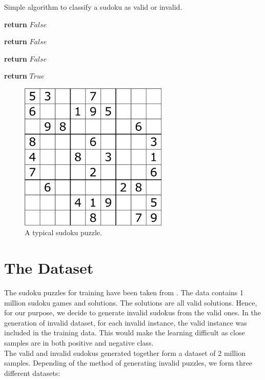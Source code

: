 \documentclass[twoside]{article}
\begin{document}
\begin{algorithm}
  \caption{Simple algorithm to classify a sudoku as valid or invalid.}\label{algo:algo1}
  \begin{algorithmic}[1]
           
    			\State \textbf{return} $False$
    		\EndIf
      	\EndFor
      \EndFor

        
    			\State \textbf{return} $False$
    		\EndIf
      	\EndFor
      \EndFor

        
    			\State \textbf{return} $False$
    		\EndIf
      	\EndFor
      \EndFor

      \State \textbf{return} $True$    
      \EndProcedure
  \end{algorithmic}
\end{algorithm}

\begin{figure}
  \centering
  \includegraphics[height=200pt]{typical_sudoku.png}
  \caption{A typical sudoku puzzle.}
  \label{fig:sudoku}
\end{figure}

\section{The Dataset}
The sudoku puzzles for training have been taken from  \cite{bryan_park}. The data contains 1 million sudoku games and solutions. The solutions are all valid solutions. Hence, for our purpose, we decide to generate invalid sudokus from the valid ones. In the generation of invalid dataset, for each invalid instance, the valid instance was included in the training data. This would make the learning difficult as close samples are in both positive and negative class. 
\\ The valid and invalid sudokus generated together form a dataset of 2 million samples. Depending of the method of generating invalid puzzles, we form three different datasets:
\end{document}

